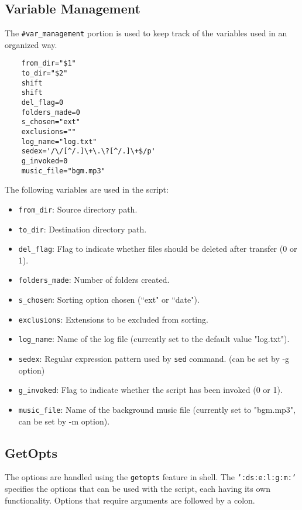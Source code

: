 \documentclass[12pt]{article}
\begin{document}
    \subsection{Variable Management}
    
    The \texttt{\#var\_management} portion is used to keep track of the variables used in an organized way.
    
    \begin{verbatim}
    from_dir="$1"
    to_dir="$2"
    shift
    shift
    del_flag=0
    folders_made=0
    s_chosen="ext"
    exclusions=""
    log_name="log.txt"
    sedex='/\/[^/.]\+\.\?[^/.]\+$/p'
    g_invoked=0
    music_file="bgm.mp3"
    \end{verbatim}    
    
    The following variables are used in the script:
    
    \begin{itemize}
        \item \texttt{from\_dir}: Source directory path.
        \item \texttt{to\_dir}: Destination directory path.
        \item \texttt{del\_flag}: Flag to indicate whether files should be deleted after transfer (0 or 1).
        \item \texttt{folders\_made}: Number of folders created.
        \item \texttt{s\_chosen}: Sorting option chosen (``ext" or ``date").
        \item \texttt{exclusions}: Extensions to be excluded from sorting.
        \item \texttt{log\_name}: Name of the log file (currently set to the default value "log.txt").
        \item \texttt{sedex}: Regular expression pattern used by \texttt{sed} command. (can be set by -g option)
        \item \texttt{g\_invoked}: Flag to indicate whether the script has been invoked (0 or 1).
        \item \texttt{music\_file}: Name of the background music file (currently set to "bgm.mp3", can be set by -m option).
    \end{itemize}


    \subsection{GetOpts}
    
    The options are handled using the \texttt{getopts} feature in shell. The \texttt{':ds:e:l:g:m:'} specifies the options that can be used with the script, each having its own functionality. Options that require arguments are followed by a colon.
    
\end{document}
